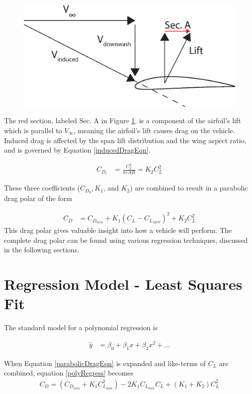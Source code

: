 \begin{figure}[H]
  \centering
  \includegraphics[width=.6\linewidth]{figures/inducedDrag.eps}
  \label{inducedDrag}
\end{figure}

The red section, labeled Sec. A in Figure \ref{inducedDrag}, is a component of the airfoil's lift which is parallel to $V_\infty$, meaning the airfoil's lift causes drag on the vehicle.\\

Induced drag is affected by the span lift distribution and the wing aspect ratio\cite{prandtl1923applications}, and is governed by Equation \ref{inducedDragEqn}.

\begin{align}
\label{inducedDragEqn}
C_{D_i} &= \frac{C^2_L}{\pi e AR} = K_2 C^2_L
\end{align}

These three coefficients ($C_{D_0},K_1$, and $K_2$) are combined to result in a parabolic drag polar of the form 

\begin{align}
\label{parabolicDragEqn}
C_D &= C_{D_{min}} + K_1(C_L-C_{L_{MIN}})^2 + K_2C^2_L
\end{align}
This drag polar gives valuable insight into how a vehicle will perform. The complete drag polar can be found using various regression techniques, discussed in the following sections.

\section{Regression Model - Least Squares Fit}
The standard model for a polynomial regression is

\begin{align}
\label{polyRegress}
\hat{y} &= \beta_0 + \beta_1x + \beta_2x^2+...
\end{align}

When Equation \ref{parabolicDragEqn} is expanded and like-terms of $C_L$ are combined, equation \ref{polyRegress} becomes
\begin{align}
C_D = (C_{D_{min}} + K_1 C^2_{L_{min}}) -2K_1C_{L_{min}}C_L+(K_1+K_2)C^2_L
\end{align}

